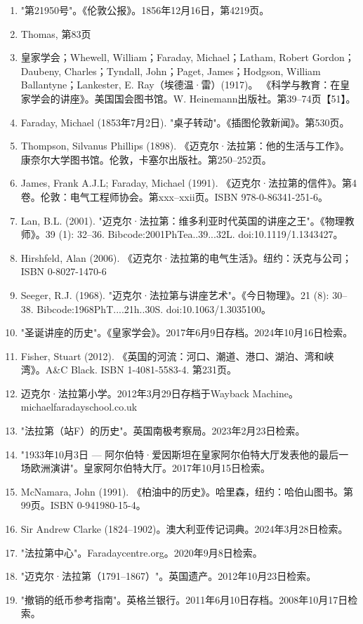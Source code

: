 \begin{enumerate}
\item "第21950号"。《伦敦公报》。1856年12月16日，第4219页。
\item Thomas, 第83页
\item 皇家学会；Whewell, William；Faraday, Michael；Latham, Robert Gordon；Daubeny, Charles；Tyndall, John；Paget, James；Hodgson, William Ballantyne；Lankester, E. Ray（埃德温·雷）(1917)。 《科学与教育：在皇家学会的讲座》。美国国会图书馆。W. Heinemann出版社。第39–74页【51】。
\item Faraday, Michael (1853年7月2日). "桌子转动"。《插图伦敦新闻》。第530页。
\item Thompson, Silvanus Phillips (1898). 《迈克尔·法拉第：他的生活与工作》。康奈尔大学图书馆。伦敦，卡塞尔出版社。第250–252页。
\item James, Frank A.J.L; Faraday, Michael (1991). 《迈克尔·法拉第的信件》。第4卷。伦敦：电气工程师协会。第xxx–xxii页。ISBN 978-0-86341-251-6。
\item Lan, B.L. (2001). "迈克尔·法拉第：维多利亚时代英国的讲座之王"。《物理教师》。39 (1): 32–36. Bibcode:2001PhTea..39...32L. doi:10.1119/1.1343427。
\item Hirshfeld, Alan (2006). 《迈克尔·法拉第的电气生活》。纽约：沃克与公司；ISBN 0-8027-1470-6
\item Seeger, R.J. (1968). "迈克尔·法拉第与讲座艺术"。《今日物理》。21 (8): 30–38. Bibcode:1968PhT....21h..30S. doi:10.1063/1.3035100。
\item "圣诞讲座的历史"。《皇家学会》。2017年6月9日存档。2024年10月16日检索。
\item Fisher, Stuart (2012). 《英国的河流：河口、潮道、港口、湖泊、湾和峡湾》。A&C Black. ISBN 1-4081-5583-4. 第231页。
\item 迈克尔·法拉第小学。2012年3月29日存档于Wayback Machine。michaelfaradayschool.co.uk
\item "法拉第（站F）的历史"。英国南极考察局。2023年2月23日检索。
\item "1933年10月3日 — 阿尔伯特·爱因斯坦在皇家阿尔伯特大厅发表他的最后一场欧洲演讲"。皇家阿尔伯特大厅。2017年10月15日检索。
\item McNamara, John (1991). 《柏油中的历史》。哈里森，纽约：哈伯山图书。第99页。ISBN 0-941980-15-4。
\item Sir Andrew Clarke (1824–1902)。澳大利亚传记词典。2024年3月28日检索。
\item "法拉第中心"。Faradaycentre.org。2020年9月8日检索。
\item "迈克尔·法拉第（1791–1867）"。英国遗产。2012年10月23日检索。
\item "撤销的纸币参考指南"。英格兰银行。2011年6月10日存档。2008年10月17日检索。

\end{enumerate}
